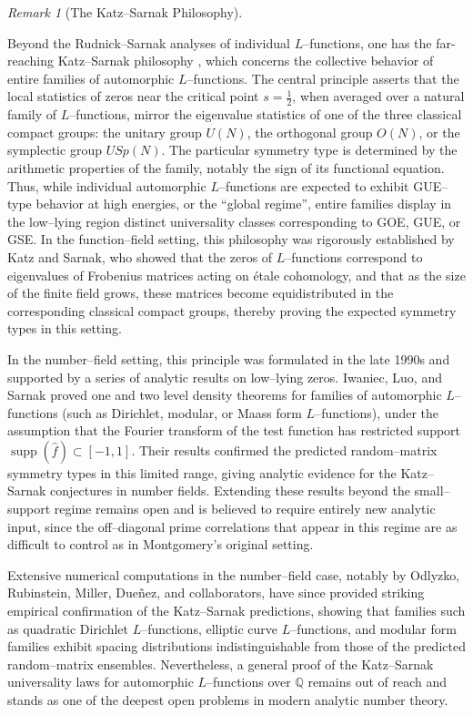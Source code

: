 \documentclass[12pt,reqno]{amsart}
\theoremstyle{plain}
\theoremstyle{definition}
\theoremstyle{remark}
\newtheorem{rem}{Remark}[section]       %
\begin{document}
\begin{rem}[The Katz--Sarnak Philosophy]
\label{rem:Katz-Sarnak}

Beyond the Rudnick–Sarnak analyses of individual $L$--functions, one has the far-reaching Katz--Sarnak philosophy \cite{KatzSarnak1999},
which concerns the collective behavior of entire families
of automorphic $L$--functions.
The central principle asserts that the local statistics of zeros near
the critical point $s=\tfrac{1}{2}$,
when averaged over a natural family of $L$--functions,
mirror the eigenvalue statistics of one of the three classical compact groups:
the unitary group $U(N)$, the orthogonal group $O(N)$, or
the symplectic group $USp(N)$.
The particular symmetry type is determined by the arithmetic
properties of the family, notably the sign of its functional equation.
Thus, while individual automorphic $L$--functions are expected to exhibit
GUE--type behavior at high energies, or the ``global regime'',
entire families display in the low–lying region distinct
universality classes corresponding to GOE, GUE, or GSE. 
In the function--field setting, this philosophy was rigorously established by Katz and Sarnak, who showed that 
the zeros of $L$--functions correspond to eigenvalues of Frobenius matrices acting on étale cohomology,
and that as the size of the finite field grows, these matrices become equidistributed in the corresponding
classical compact groups, thereby proving the expected symmetry types in this setting.

In the number--field setting, this principle was formulated in the late 1990s
and supported by a series of analytic results on low--lying zeros.
Iwaniec, Luo, and Sarnak \cite{IwaniecLuoSarnak1999} proved one and two level
density theorems for families of automorphic $L$--functions
(such as Dirichlet, modular, or Maass form $L$--functions),
under the assumption that the Fourier transform of the test function
has restricted support $\operatorname{supp}(\widehat{f})\subset[-1,1]$.
Their results confirmed the predicted random--matrix symmetry types
in this limited range, giving analytic evidence for the
Katz--Sarnak conjectures in number fields.
Extending these results beyond the small--support regime remains open
and is believed to require entirely new analytic input,
since the off--diagonal prime correlations that appear in this regime
are as difficult to control as in Montgomery’s original setting.

Extensive numerical computations in the number--field case,
notably by Odlyzko, Rubinstein, Miller, Dueñez, and collaborators,
have since provided striking empirical confirmation of the
Katz--Sarnak predictions, showing that families such as quadratic Dirichlet $L$--functions,
elliptic curve $L$--functions, and modular form families
exhibit spacing distributions indistinguishable from those of the
predicted random--matrix ensembles.
Nevertheless, a general proof of the Katz--Sarnak universality laws
for automorphic $L$--functions over $\mathbb{Q}$ remains out of reach
and stands as one of the deepest open problems in modern analytic number theory.


\end{rem}
\end{document}
